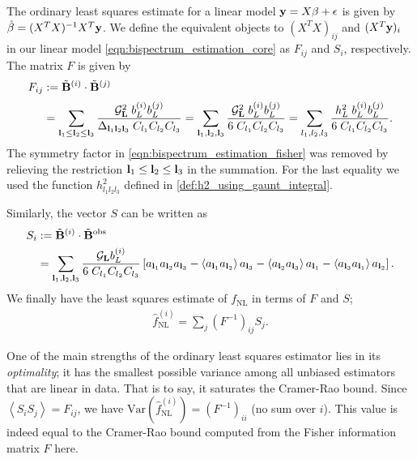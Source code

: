 The ordinary least squares estimate for a linear model $\mathbf{y} = X\mathbf{\beta} + \mathbf{\epsilon}$ is given by $\hat{\beta} = (X^T X)^{-1} X^T \mathbf{y}$. We define the equivalent objects to $(X^T X)_{ij}$ and $(X^T \mathbf{y})_i$ in our linear model \eqref{eqn:bispectrum_estimation_core} as $F_{ij}$ and $S_i$, respectively. The matrix $F$ is given by
\begin{align}
	F_{ij} &:= \tilde{\mathbf{B}}^{(i)} \cdot \tilde{\mathbf{B}}^{(j)} \\[0.5ex]
	&= \sum_{\mathbf{l}_1 \le \mathbf{l}_2 \le \mathbf{l}_3}  \frac{\mathcal{G}_{\mathbf{L}}^2 \; b^{(i)}_{L} b^{(j)}_{L}}{\Delta_{\mathbf{l}_1 \mathbf{l}_2 \mathbf{l}_3} \; C_{l_1} C_{l_2} C_{l_3}}   
	= \sum_{\mathbf{l}_1 , \mathbf{l}_2 , \mathbf{l}_3}  \frac{\mathcal{G}_{\mathbf{L}}^2 \; b^{(i)}_{L} b^{(j)}_{L}}{6 \; C_{l_1} C_{l_2} C_{l_3}}
	= \sum_{l_1,l_2,l_3}  \frac{h^2_L \; b^{(i)}_{L} b^{(j)}_{L}}{6 \; C_{l_1} C_{l_2} C_{l_3}}. \label{eqn:bispectrum_estimation_fisher}
\end{align}
The symmetry factor in \eqref{eqn:bispectrum_estimation_fisher} was removed by relieving the restriction $\mathbf{l}_1 \le \mathbf{l}_2 \le \mathbf{l}_3$ in the summation. For the last equality we used the function $h^2_{l_1 l_2 l_3}$ defined in \eqref{def:h2_using_gaunt_integral}.

Similarly, the vector $S$ can be written as
\begin{align}
	S_i &:= \tilde{\mathbf{B}}^{(i)} \cdot \tilde{\mathbf{B}}^\text{obs} \\
	&= \sum_{\mathbf{l}_1 , \mathbf{l}_2 , \mathbf{l}_3} \frac{\mathcal{G}_{\mathbf{L}} b^{(i)}_{L}}{6 \; C_{l_1} C_{l_2} C_{l_3}} \left[ a_{\mathbf{l}_1} a_{\mathbf{l}_2} a_{\mathbf{l}_3} - \left< a_{\mathbf{l}_1} a_{\mathbf{l}_2} \right> a_{\mathbf{l}_3} - \left< a_{\mathbf{l}_2} a_{\mathbf{l}_3} \right> a_{\mathbf{l}_1} - \left< a_{\mathbf{l}_3} a_{\mathbf{l}_1} \right> a_{\mathbf{l}_2} \right].
	\label{eqn:bispectrum_estimation_signal}
\end{align}
We finally have the least squares estimate of $f_\text{NL}$ in terms of $F$ and $S$;
\begin{align}
	\hat{f}_\text{NL}^{(i)} = \sum_j (F^{-1})_{ij} S_j. \label{eqn:bispectrum_estimation_ols_estimate}
\end{align}

One of the main strengths of the ordinary least squares estimator lies in its \textit{optimality}; it has the smallest possible variance among all unbiased estimators that are linear in data. That is to say, it saturates the Cramer-Rao bound. Since $\left< S_i S_j \right> = F_{ij}$, we have $\text{Var}(\hat{f}_\text{NL}^{(i)}) = (F^{-1})_{ii}$ (no sum over $i$). This value is indeed equal to the Cramer-Rao bound computed from the Fisher information matrix $F$ here.

